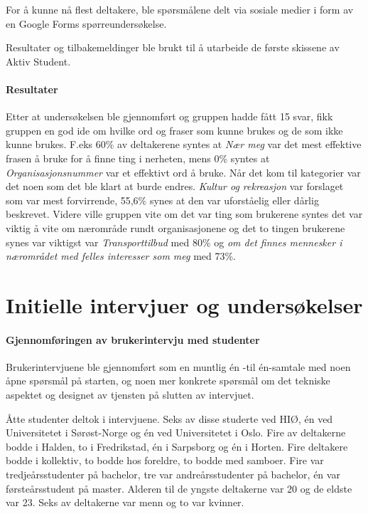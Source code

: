 For å kunne nå flest deltakere, ble spørsmålene delt via sosiale medier i form av en Google Forms spørreundersøkelse.

Resultater og tilbakemeldinger ble brukt til å utarbeide de første skissene av Aktiv Student. 

\paragraph{Resultater}
Etter at undersøkelsen ble gjennomført og gruppen hadde fått 15 svar, fikk gruppen en god ide om hvilke ord og fraser som kunne brukes og de som ikke kunne brukes. F.eks 60\% av deltakerene syntes at {\em  Nær meg} var det mest effektive frasen å bruke for å finne ting i nerheten, mens 0\% syntes at {\em  Organisasjonsnummer} var et effektivt ord å bruke. Når det kom til kategorier var det noen som det ble klart at burde endres. {\em  Kultur og rekreasjon} var forslaget som var mest forvirrende, 55,6\% synes at den var uforståelig eller dårlig beskrevet. Videre ville gruppen vite om det var ting som brukerene syntes det var viktig å vite om nærområde rundt organisasjonene og det to tingen brukerene synes var viktigst var {\em  Transporttilbud} med 80\% og {\em om det finnes mennesker i nærområdet med felles interesser som meg} med 73\%.

\section{Initielle intervjuer og undersøkelser}
\label{section:init-brukerintervjuer}
\paragraph{Gjennomføringen av brukerintervju med studenter}
Brukerintervjuene ble gjennomført som en muntlig én -til én-samtale med noen åpne spørsmål på starten, og noen mer konkrete spørsmål om det tekniske aspektet og designet av tjensten på slutten av intervjuet. 

Åtte studenter deltok i intervjuene. Seks av disse studerte ved HIØ, én ved Universitetet i Sørøst-Norge og én ved Universitetet i Oslo. Fire av deltakerne bodde i Halden, to i Fredrikstad, én i Sarpsborg og én i Horten. Fire deltakere bodde i kollektiv, to bodde hos foreldre, to bodde med samboer. Fire var tredjeårsstudenter på bachelor, tre var andreårsstudenter på bachelor, én var førsteårsstudent på master. Alderen til de yngste deltakerne var 20 og de eldste var 23. Seks av deltakerne var menn og to var kvinner.

